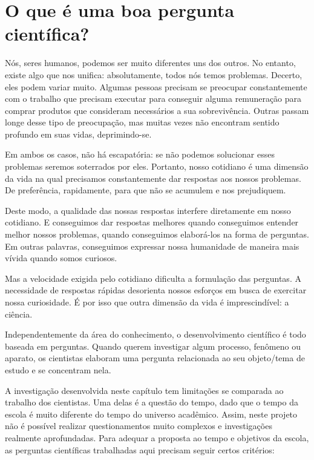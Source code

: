 \label{etapa2}

\label{pergunta-cientifica}
\vspace{-.5\baselineskip}
\section{O que é uma boa pergunta científica?}

Nós, seres humanos, podemos ser muito diferentes uns dos outros. No entanto, existe algo que nos unifica: absolutamente, todos nós temos problemas. Decerto, eles podem variar muito. Algumas pessoas precisam se preocupar constantemente com o trabalho que precisam executar para conseguir alguma remuneração para comprar produtos que consideram necessários a sua sobrevivência. Outras passam longe desse tipo de preocupação, mas muitas vezes não encontram sentido profundo em suas vidas, deprimindo-se.

Em ambos os casos, não há escapatória: se não podemos solucionar esses problemas seremos soterrados por eles. Portanto, nosso cotidiano é uma dimensão da vida na qual precisamos constantemente dar respostas aos nossos problemas. De preferência, rapidamente, para que não se acumulem e nos prejudiquem.

Deste modo, a qualidade das nossas respostas interfere diretamente em nosso cotidiano. E conseguimos dar respostas melhores quando conseguimos entender melhor nossos problemas, quando conseguimos elaborá-los na forma de perguntas. Em outras palavras, conseguimos expressar nossa humanidade de maneira mais vívida quando somos curiosos.  

Mas a velocidade exigida pelo cotidiano dificulta a formulação das perguntas. A necessidade de respostas rápidas desorienta nossos esforços em busca de exercitar nossa curiosidade. É por isso que outra dimensão da vida é imprescindível: a ciência.

Independentemente da área do conhecimento, o desenvolvimento científico é todo baseada em perguntas. Quando querem investigar algum processo, fenômeno ou aparato, os cientistas elaboram uma pergunta relacionada ao seu objeto/tema de estudo e se concentram nela. 

A investigação desenvolvida neste capítulo tem limitações se comparada ao trabalho dos cientistas. Uma delas é a questão do tempo, dado que o tempo da escola é muito diferente do tempo do universo acadêmico. Assim, neste projeto não é possível realizar questionamentos muito complexos e investigações realmente aprofundadas. Para adequar a proposta ao tempo e objetivos da escola, as perguntas científicas trabalhadas aqui precisam seguir certos critérios:

